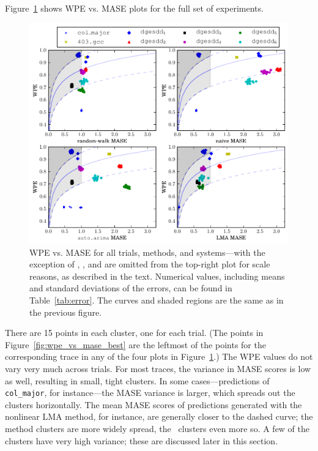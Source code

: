 Figure~\ref{fig:wpe_vs_mase_all} shows WPE vs. MASE plots for the full
set of experiments.
\begin{figure}
  \centering
  \includegraphics[width=1.7\columnwidth]{figs/new_predictions_vs_entropy4a}
\caption{WPE vs. MASE for all trials, methods, and systems---with the
  exception of \svdone, \svdthree, and \svdfive are omitted from the
  top-right plot for scale reasons, as described in the text.
%
%
Numerical values, including means and standard deviations of the
errors, can be found in Table~\ref{tab:error}.  The curves and shaded
regions are the same as in the previous figure.  }
    \label{fig:wpe_vs_mase_all}
\end{figure}
There are 15 points in each cluster, one for each trial.  (The points
in Figure~\ref{fig:wpe_vs_mase_best} are the leftmost of the points
for the corresponding trace in any of the four plots in
Figure~\ref{fig:wpe_vs_mase_all}.)  The WPE values do not vary very
much across trials.  For most traces, the variance in MASE scores is
low as well, resulting in small, tight clusters.  In some
cases---\arima predictions of {\tt col\_major}, for instance---the
MASE variance is larger, which spreads out the clusters horizontally.
The mean MASE scores of predictions generated with the nonlinear LMA
method, for instance, are generally closer to the dashed curve; the
\arima method clusters are more widely spread, the \naive ~clusters
even more so.  A few of the clusters have very high variance; these
are discussed later in this section.

